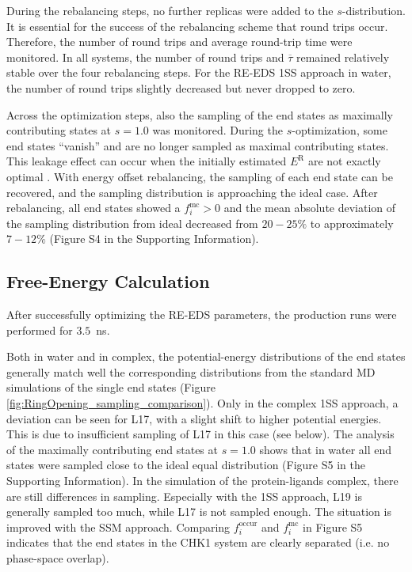 During the rebalancing steps, no further replicas were added to the $s$-distribution. It is essential for the success of the rebalancing scheme that round trips occur. Therefore, the number of round trips and average round-trip time were monitored. In all systems, the number of round trips and $\overline{\tau}$ remained relatively stable over the four rebalancing steps. For the RE-EDS 1SS approach in water, the number of round trips slightly decreased but never dropped to zero.

Across the optimization steps, also the sampling of the end states as maximally contributing states at $s=1.0$ was monitored.
During the $s$-optimization, some end states ``vanish'' and are no longer sampled as maximal contributing states. This leakage effect can occur when the initially estimated $E^{\text{R}}$ are not exactly optimal \cite{Sidler2016}. 
With energy offset rebalancing, the sampling of each end state can be recovered, and the sampling distribution is approaching the ideal case.
After rebalancing, all end states showed a $f_i^{\text{mc}} > 0$ and the mean absolute deviation of the sampling distribution from ideal decreased from $20-25\%$ to approximately $7-12\%$ (Figure S4 in the Supporting Information). %
 
\subsection{Free-Energy Calculation}
After successfully optimizing the RE-EDS parameters, the production runs were performed for $3.5$~ns. 

Both in water and in complex, the potential-energy distributions of the end states generally match well the corresponding distributions from the standard MD simulations of the single end states (Figure \ref{fig:RingOpening_sampling_comparison}). Only in the complex 1SS approach, a deviation can be seen for L17, with a slight shift to higher potential energies. This is due to insufficient sampling of L17 in this case (see below). 
%
The analysis of the maximally contributing end states at $s=1.0$ shows that in water all end states were sampled close to the ideal equal distribution (Figure S5 in the Supporting Information). %
In the simulation of the protein-ligands complex, there are still differences in sampling. Especially with the 1SS approach, L19 is generally sampled too much, while L17 is not sampled enough. The situation is improved with the SSM approach.
Comparing $f_i^{\text{occur}}$ and $f_i^{\text{mc}}$ in Figure S5 indicates that the end states in the CHK1 system are clearly separated (i.e. no phase-space overlap). %

